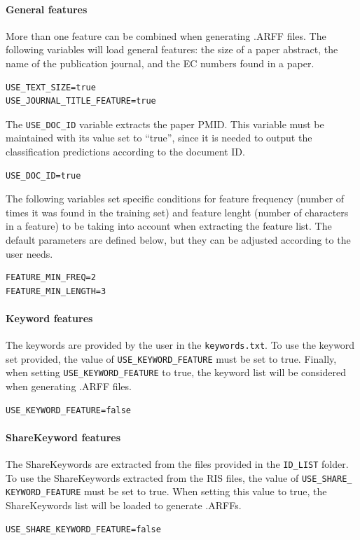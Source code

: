 \documentclass[11pt]{article}
\begin{document}
\paragraph{General features}
More than one feature can be combined when generating .ARFF files.
The following variables will load general features: the size of a paper abstract, 
the name of the publication journal, and the EC numbers found in a paper.
\begin{lstlisting} 
USE_TEXT_SIZE=true
USE_JOURNAL_TITLE_FEATURE=true
\end{lstlisting}

The \texttt{USE\_DOC\_ID} variable extracts the paper PMID.
This variable must be maintained with its value set to ``true'', 
since it is needed to output the classification predictions according to the document ID.
\begin{lstlisting}
USE_DOC_ID=true
\end{lstlisting}

The following variables set specific conditions for feature frequency (number of times it was found in the training set)
and feature lenght (number of characters in a feature) to be taking into account when extracting the feature list.
The default parameters are defined below, but they can be adjusted according to the user needs.
\begin{lstlisting}
FEATURE_MIN_FREQ=2
FEATURE_MIN_LENGTH=3
\end{lstlisting}

\paragraph{Keyword features}
The keywords are provided by the user in the \texttt{keywords.txt}.
To use the keyword set provided, the value of \texttt{USE\_KEYWORD\_FEATURE} must be set to true.
Finally, when setting \texttt{USE\_KEYWORD\_FEATURE} to true, the keyword list will be 
considered when generating .ARFF files.
\begin{lstlisting}
USE_KEYWORD_FEATURE=false
\end{lstlisting}

\paragraph{ShareKeyword features}
The ShareKeywords are extracted from the files provided in the \texttt{ID\_LIST} folder.
To use the ShareKeywords extracted from the RIS files, the value of \texttt{USE\_SHARE\_ KEYWORD\_FEATURE} must be set to true.
When setting this value to true, the ShareKeywords list will be loaded to generate .ARFFs.
\begin{lstlisting}
USE_SHARE_KEYWORD_FEATURE=false
\end{lstlisting}
\end{document}
